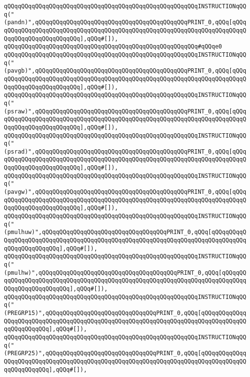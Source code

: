 \verb|qQQqqQQqqQQqqQQqqQQqqQQqqQQqqQQqqQQqqQQqqQQqqQQqqQQqqQQqINSTRUCTIONqQQq("(pandn)",qQQqqQQqqQQqqQQqqQQqqQQqqQQqqQQqqQQqqQQqqQQqPRINT_0,qQQq[qQQqqQQqqQQqqQQqqQQqqQQqqQQqqQQqqQQqqQQqqQQqqQQqqQQqqQQqqQQqqQQqqQQqqQQqqQQqqQQqqQQqqQQqqQQqqQQq],qQQq#[]),|\newline
\verb|qQQqqQQqqQQqqQQqqQQqqQQqqQQqqQQqqQQqqQQqqQQqqQQqqQQqqQQq#qQQqe0|\newline
\verb|qQQqqQQqqQQqqQQqqQQqqQQqqQQqqQQqqQQqqQQqqQQqqQQqqQQqqQQqINSTRUCTIONqQQq("(pavgb)",qQQqqQQqqQQqqQQqqQQqqQQqqQQqqQQqqQQqqQQqqQQqPRINT_0,qQQq[qQQqqQQqqQQqqQQqqQQqqQQqqQQqqQQqqQQqqQQqqQQqqQQqqQQqqQQqqQQqqQQqqQQqqQQqqQQqqQQqqQQqqQQqqQQqqQQq],qQQq#[]),|\newline
\verb|qQQqqQQqqQQqqQQqqQQqqQQqqQQqqQQqqQQqqQQqqQQqqQQqqQQqqQQqINSTRUCTIONqQQq("(psraw)",qQQqqQQqqQQqqQQqqQQqqQQqqQQqqQQqqQQqqQQqqQQqPRINT_0,qQQq[qQQqqQQqqQQqqQQqqQQqqQQqqQQqqQQqqQQqqQQqqQQqqQQqqQQqqQQqqQQqqQQqqQQqqQQqqQQqqQQqqQQqqQQqqQQqqQQq],qQQq#[]),|\newline
\verb|qQQqqQQqqQQqqQQqqQQqqQQqqQQqqQQqqQQqqQQqqQQqqQQqqQQqqQQqINSTRUCTIONqQQq("(psrad)",qQQqqQQqqQQqqQQqqQQqqQQqqQQqqQQqqQQqqQQqqQQqPRINT_0,qQQq[qQQqqQQqqQQqqQQqqQQqqQQqqQQqqQQqqQQqqQQqqQQqqQQqqQQqqQQqqQQqqQQqqQQqqQQqqQQqqQQqqQQqqQQqqQQqqQQq],qQQq#[]),|\newline
\verb|qQQqqQQqqQQqqQQqqQQqqQQqqQQqqQQqqQQqqQQqqQQqqQQqqQQqqQQqINSTRUCTIONqQQq("(pavgw)",qQQqqQQqqQQqqQQqqQQqqQQqqQQqqQQqqQQqqQQqqQQqPRINT_0,qQQq[qQQqqQQqqQQqqQQqqQQqqQQqqQQqqQQqqQQqqQQqqQQqqQQqqQQqqQQqqQQqqQQqqQQqqQQqqQQqqQQqqQQqqQQqqQQqqQQq],qQQq#[]),|\newline
\verb|qQQqqQQqqQQqqQQqqQQqqQQqqQQqqQQqqQQqqQQqqQQqqQQqqQQqqQQqINSTRUCTIONqQQq("(pmulhuw)",qQQqqQQqqQQqqQQqqQQqqQQqqQQqqQQqqQQqPRINT_0,qQQq[qQQqqQQqqQQqqQQqqQQqqQQqqQQqqQQqqQQqqQQqqQQqqQQqqQQqqQQqqQQqqQQqqQQqqQQqqQQqqQQqqQQqqQQqqQQqqQQq],qQQq#[]),|\newline
\verb|qQQqqQQqqQQqqQQqqQQqqQQqqQQqqQQqqQQqqQQqqQQqqQQqqQQqqQQqINSTRUCTIONqQQq("(pmulhw)",qQQqqQQqqQQqqQQqqQQqqQQqqQQqqQQqqQQqqQQqPRINT_0,qQQq[qQQqqQQqqQQqqQQqqQQqqQQqqQQqqQQqqQQqqQQqqQQqqQQqqQQqqQQqqQQqqQQqqQQqqQQqqQQqqQQqqQQqqQQqqQQqqQQq],qQQq#[]),|\newline
\verb|qQQqqQQqqQQqqQQqqQQqqQQqqQQqqQQqqQQqqQQqqQQqqQQqqQQqqQQqINSTRUCTIONqQQq("(PREGRP15)",qQQqqQQqqQQqqQQqqQQqqQQqqQQqqQQqPRINT_0,qQQq[qQQqqQQqqQQqqQQqqQQqqQQqqQQqqQQqqQQqqQQqqQQqqQQqqQQqqQQqqQQqqQQqqQQqqQQqqQQqqQQqqQQqqQQqqQQqqQQq],qQQq#[]),|\newline
\verb|qQQqqQQqqQQqqQQqqQQqqQQqqQQqqQQqqQQqqQQqqQQqqQQqqQQqqQQqINSTRUCTIONqQQq("(PREGRP25)",qQQqqQQqqQQqqQQqqQQqqQQqqQQqqQQqPRINT_0,qQQq[qQQqqQQqqQQqqQQqqQQqqQQqqQQqqQQqqQQqqQQqqQQqqQQqqQQqqQQqqQQqqQQqqQQqqQQqqQQqqQQqqQQqqQQqqQQqqQQq],qQQq#[]),|\newline
